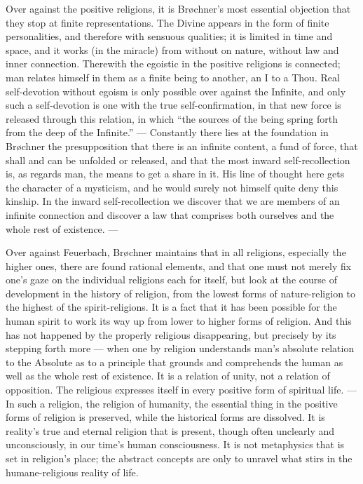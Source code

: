 \documentclass[12pt,a4paper]{book}
\newcommand{\opage}[1]{\marginnote{\footnotesize\textit{[#1]}}}
\begin{document}
Over against the positive religions, it is Brøchner's most essential objection that they stop at
finite representations. The Divine appears in the form of finite personalities, and therefore with
sensuous qualities; it is limited in time and space, and it works (in the miracle) from without on
nature, without law and inner connection. Therewith the egoistic in the positive religions is
connected; man relates himself in them as a finite being to another, an I to a Thou. Real
self-devotion without egoism is only possible over against the Infinite, and only such a
self-devotion is one with \opage{205}the true self-confirmation, in that new force is released through this
relation, in which ``the sources of the being spring forth from the deep of the Infinite.'' ---
Constantly there lies at the foundation in Brøchner the presupposition that there is an infinite
content, a fund of force, that shall and can be unfolded or released, and that the most inward
self-recollection is, as regards man, the means to get a share in it. His line of thought here
gets the character of a mysticism, and he would surely not himself quite deny this kinship. In the
inward self-recollection we discover that we are members of an infinite connection and discover a
law that comprises both ourselves and the whole rest of existence. ---

Over against Feuerbach, Brøchner maintains that in all religions, especially the higher ones,
there are found rational elements, and that one must not merely fix one's gaze on the individual
religions each for itself, but look at the course of development in the history of religion, from
the lowest forms of nature-religion to the highest of the spirit-religions. It is a fact that it
has been possible for the human spirit to work its way up from lower to higher forms of religion.
And this has not happened by the properly religious disappearing, but precisely by its stepping
forth more --- when one by religion understands man's absolute relation to the Absolute as to a
principle that grounds and comprehends the human as well as the whole rest of existence. It is a
relation of unity, not a relation of opposition. The religious expresses itself in every positive
form of spiritual life. --- In such a religion, the religion of humanity, the essential thing in
the positive forms of religion is preserved, while the historical forms are dissolved. It is
reality's true and eternal religion that is present, though often unclearly and unconsciously, in
our time's human consciousness. It is not metaphysics that is set in religion's place; the
abstract concepts are only to unravel what stirs in the humane-religious reality of life.
\end{document}
